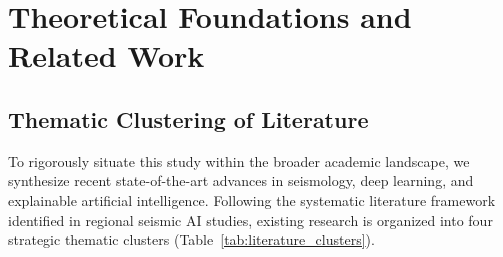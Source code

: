 \documentclass[journal]{IEEEtran}
\begin{document}
\section{Theoretical Foundations and Related Work}

\subsection{Thematic Clustering of Literature}
To rigorously situate this study within the broader academic landscape, we synthesize recent state-of-the-art advances in seismology, deep learning, and explainable artificial intelligence. Following the systematic literature framework identified in regional seismic AI studies, existing research is organized into four strategic thematic clusters (Table~\ref{tab:literature_clusters}).
\end{document}
